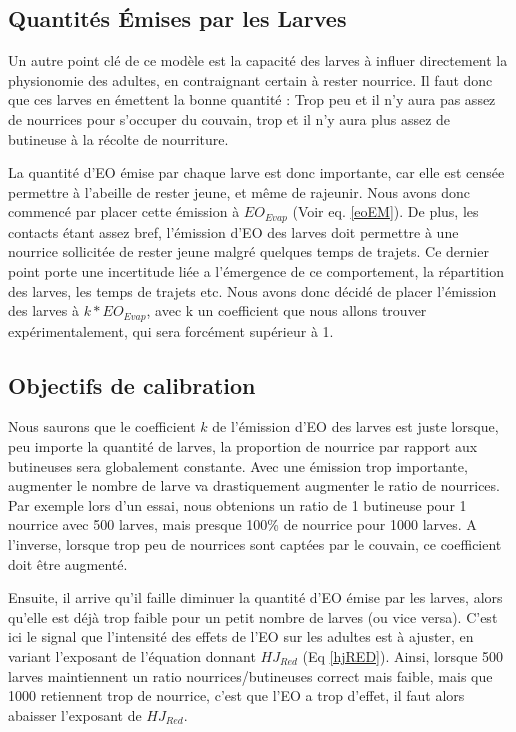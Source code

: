 	
	
	\subsection{Quantités Émises par les Larves}
	Un autre point clé de ce modèle est la capacité des larves à influer directement la physionomie des adultes, en contraignant certain à rester nourrice. Il faut donc  que ces larves en émettent la bonne quantité : Trop peu et il n'y aura pas assez de nourrices pour s'occuper du couvain, trop et il n'y aura plus assez de butineuse à la récolte de nourriture.
	
	La quantité d'EO émise par chaque larve est donc importante, car elle est censée permettre à l'abeille de rester jeune, et même de rajeunir. Nous avons donc commencé par placer cette émission à $EO_{Evap}$ (Voir eq. \ref{eoEM}). De plus, les contacts étant assez bref, l'émission d'EO des larves doit permettre à une nourrice sollicitée de rester jeune malgré quelques temps de trajets. Ce dernier point porte une incertitude liée a l'émergence de ce comportement, la répartition des larves, les temps de trajets etc. Nous avons donc décidé de placer l'émission des larves à $k * EO_{Evap}$, avec k un coefficient que nous allons trouver expérimentalement, qui sera forcément supérieur à 1.
	
	\subsection{Objectifs de calibration}
	Nous saurons que le coefficient $k$ de l'émission d'EO des larves est juste lorsque, peu importe la quantité de larves, la proportion de nourrice par rapport aux butineuses sera globalement constante. Avec une émission trop importante, augmenter le nombre de larve va drastiquement augmenter le ratio de nourrices. Par exemple lors d'un essai, nous obtenions un ratio de 1 butineuse pour 1 nourrice avec 500 larves, mais presque 100\% de nourrice pour 1000 larves. A l'inverse, lorsque trop peu de nourrices sont captées par le couvain, ce coefficient doit être augmenté.
	
	Ensuite, il arrive qu'il faille diminuer la quantité d'EO émise par les larves, alors qu'elle est déjà trop faible pour un petit nombre de larves (ou vice versa). C'est ici le signal que l'intensité des effets de l'EO sur les adultes est à ajuster, en variant l'exposant de l'équation donnant $HJ_{Red}$ (Eq \ref{hjRED}). Ainsi, lorsque 500 larves maintiennent un ratio nourrices/butineuses correct mais faible, mais que 1000 retiennent trop de nourrice, c'est que l'EO a trop d'effet, il faut alors abaisser l'exposant de $HJ_{Red}$. 
	
